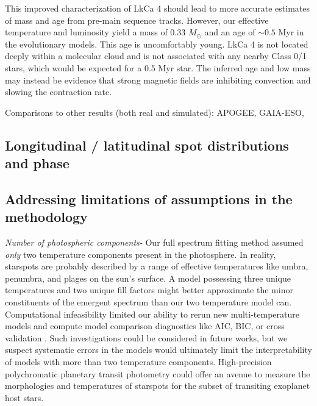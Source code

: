 \documentclass[twocolumn]{emulateapj}%
\begin{document}
This improved characterization of LkCa 4 should lead to more accurate estimates of mass and age from pre-main sequence tracks.  However, our effective temperature and luminosity yield a mass of 0.33 $M_\odot$ and an age of $\sim 0.5$ Myr in the \citet{baraffe15} evolutionary models.  This age is uncomfortably young.  LkCa 4 is not located deeply within a molecular cloud and is not associated with any nearby Class 0/1 stars, which would be expected for a 0.5 Myr star.  The inferred age and low mass may instead be evidence that strong magnetic fields are inhibiting convection and slowing the contraction rate.





Comparisons to other results (both real and simulated):  APOGEE, GAIA-ESO, 



\subsection{Longitudinal / latitudinal spot distributions and phase}



\subsection{Addressing limitations of assumptions in the methodology}

\emph{Number of photospheric components-}  Our full spectrum fitting method assumed \emph{only} two temperature components present in the photosphere.  In reality, starspots are probably described by a range of effective temperatures like umbra, penumbra, and plages on the sun's surface.  A model possessing three unique temperatures and two unique fill factors might better approximate the minor constituents of the emergent spectrum than our two temperature model can.  Computational infeasibility limited our ability to rerun new multi-temperature models and compute model comparison diagnostics like AIC, BIC, or cross validation \citep{ivezic14}.  Such investigations could be considered in future works, but we suspect systematic errors in the models would ultimately limit the interpretability of models with more than two temperature components.  High-precision polychromatic planetary transit photometry could offer an avenue to measure the morphologies and temperatures of starspots for the subset of transiting exoplanet host stars.
\end{document}

